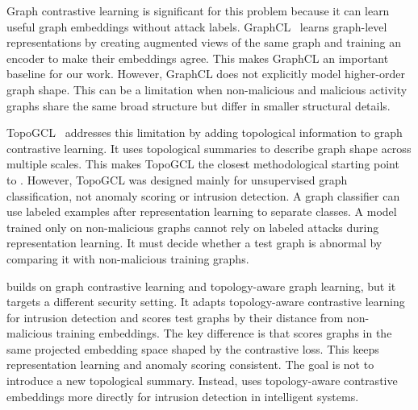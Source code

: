 Graph contrastive learning is significant for this problem because it can learn useful graph embeddings without attack labels. GraphCL~\cite{you2020graphcl} learns graph-level representations by creating augmented views of the same graph and training an encoder to make their embeddings agree. This makes GraphCL an important baseline for our work. However, GraphCL does not explicitly model higher-order graph shape. This can be a limitation when non-malicious and malicious activity graphs share the same broad structure but differ in smaller structural details.

TopoGCL~\cite{chen2024topogcl} addresses this limitation by adding topological information to graph contrastive learning. It uses topological summaries to describe graph shape across multiple scales. This makes TopoGCL the closest methodological starting point to \sysname. However, TopoGCL was designed mainly for unsupervised graph classification, not anomaly scoring or intrusion detection. A graph classifier can use labeled examples after representation learning to separate classes. A model trained only on non-malicious graphs cannot rely on labeled attacks during representation learning. It must decide whether a test graph is abnormal by comparing it with non-malicious training graphs.

\sysname builds on graph contrastive learning and topology-aware graph learning, but it targets a different security setting. It adapts topology-aware contrastive learning for intrusion detection and scores test graphs by their distance from non-malicious training embeddings. The key difference is that \sysname scores graphs in the same projected embedding space shaped by the contrastive loss. This keeps representation learning and anomaly scoring consistent. The goal is not to introduce a new topological summary. Instead, \sysname uses topology-aware contrastive embeddings more directly for intrusion detection in intelligent systems.
